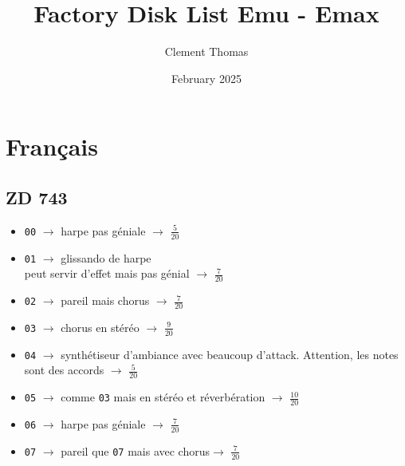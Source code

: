 \documentclass[a4paper, 13pt]{article}
\title{Factory Disk List Emu - Emax}
\author{Clement Thomas}
\date{February 2025}
\begin{document}
\maketitle

\vspace{3cm}
\section*{Français}
\vspace{1cm}
\subsection*{ZD 743}
\begin{itemize}
    \item \texttt{00} $\rightarrow$ harpe pas géniale $\rightarrow$ \Large{$\frac{5}{20}$} \normalsize \vspace{0.2cm}
    \item \texttt{01} $\rightarrow$ glissando de harpe \\ peut servir d'effet mais pas génial $\rightarrow$ \Large{$\frac{7}{20}$} \normalsize\vspace{0.2cm}
    \item \texttt{02} $ \rightarrow$ pareil mais chorus $\rightarrow$ \Large{$\frac{7}{20}$} \normalsize \vspace{0.2cm}
    \item \texttt{03} $ \rightarrow$ chorus en stéréo $\rightarrow$ \Large{$\frac{9}{20}$} \normalsize \vspace{0.2cm}
    \item \texttt{04} $ \rightarrow$ synthétiseur d'ambiance avec beaucoup d'attack. Attention, les notes sont des accords $\rightarrow$ \Large{$\frac{5}{20}$} \normalsize \vspace{0.2cm}
    \item \texttt{05} $ \rightarrow$ comme \texttt{03} mais en stéréo et réverbération $\rightarrow$ \Large{$\frac{10}{20}$} \normalsize \vspace{0.2cm}
    \item \texttt{06} $ \rightarrow$ harpe pas géniale $\rightarrow$ \Large{$\frac{7}{20}$} \normalsize \vspace{0.2cm}
    \item \texttt{07} $ \rightarrow$ pareil que \texttt{07} mais avec chorus$\rightarrow$ \Large{$\frac{7}{20}$} \normalsize \vspace{0.2cm}
\end{itemize}
\end{document}
